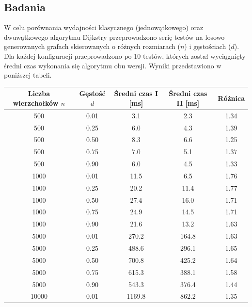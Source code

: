 \documentclass[a4paper,12pt]{article}
\begin{document}
        \subsection{Badania}
            \vspace{1em}
            W celu porównania wydajności klasycznego (jednowątkowego) oraz dwuwątkowego algorytmu Dijkstry przeprowadzono serię testów na losowo generowanych grafach skierowanych o różnych rozmiarach ($n$) i gęstościach ($d$). Dla każdej konfiguracji przeprowadzono po 10 testów, których został wyciągnięty średni czas wykonania się algorytmu obu wersji. Wyniki przedstawiono w poniższej tabeli.
            \begin{table}[H]
                \centering
                \hspace*{-1em}\begin{tabular}{|c|c|c|c|c|}
                    \hline
                    Liczba wierzchołków $n$ & Gęstość $d$ & Średni czas I [ms] & Średni czas II [ms] & Różnica \\
                    \hline
                    500   & 0.01 & 3.1   & 2.3   & 1.34 \\
                    500   & 0.25 & 6.0   & 4.3   & 1.39 \\
                    500   & 0.50 & 8.3   & 6.6   & 1.25 \\
                    500   & 0.75 & 7.0   & 5.1   & 1.37 \\
                    500   & 0.90 & 6.0   & 4.5   & 1.33 \\
                    1000  & 0.01 & 11.5  & 6.5   & 1.76 \\
                    1000  & 0.25 & 20.2  & 11.4  & 1.77 \\
                    1000  & 0.50 & 27.4  & 16.0  & 1.71 \\
                    1000  & 0.75 & 24.9  & 14.5  & 1.71 \\
                    1000  & 0.90 & 21.6  & 13.2  & 1.63 \\
                    5000  & 0.01 & 270.2  & 164.8 & 1.63 \\
                    5000  & 0.25 & 488.6  & 296.1  & 1.65 \\
                    5000  & 0.50 & 700.8  & 425.2  & 1.64 \\
                    5000  & 0.75 & 615.3  & 388.1  & 1.58 \\
                    5000  & 0.90 & 543.3  & 376.4  & 1.44 \\
                    10000 & 0.01 & 1169.8 & 862.2  & 1.35 \\

\end{tabular}
\end{table}
\end{document}
